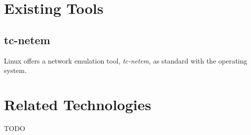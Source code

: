 \section{Existing Tools}

\subsection{tc-netem}

Linux offers a network emulation tool, \emph{tc-netem}, as standard with the operating system\cite{tc_netem_8_man,
    tc_netem_src}.


\section{Related Technologies}

TODO
